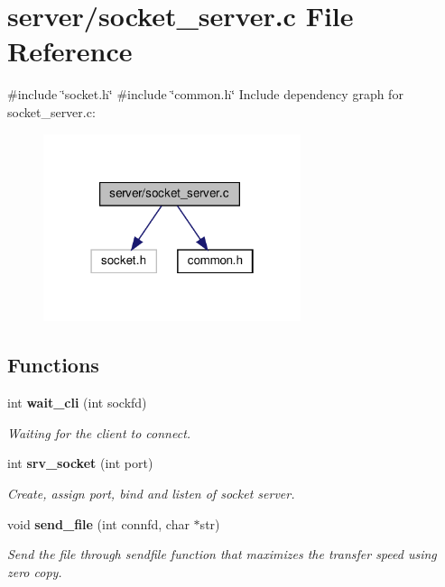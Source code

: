 \section{server/socket\+\_\+server.c File Reference}
\label{socket__server_8c}
{\ttfamily \#include \char`\"{}socket.\+h\char`\"{}}\newline
{\ttfamily \#include \char`\"{}common.\+h\char`\"{}}\newline
Include dependency graph for socket\+\_\+server.\+c\+:\nopagebreak
\begin{figure}[H]
\begin{center}
\leavevmode
\includegraphics[width=214pt]{socket__server_8c__incl}
\end{center}
\end{figure}
\subsection*{Functions}
\begin{DoxyCompactItemize}
\item 
int \textbf{ wait\+\_\+cli} (int sockfd)
\begin{DoxyCompactList}\small\item\em Waiting for the client to connect. \end{DoxyCompactList}\item 
int \textbf{ srv\+\_\+socket} (int port)
\begin{DoxyCompactList}\small\item\em Create, assign port, bind and listen of socket server. \end{DoxyCompactList}\item 
void \textbf{ send\+\_\+file} (int connfd, char $\ast$str)
\begin{DoxyCompactList}\small\item\em Send the file through sendfile function that maximizes the transfer speed using zero copy. \end{DoxyCompactList}\end{DoxyCompactItemize}


